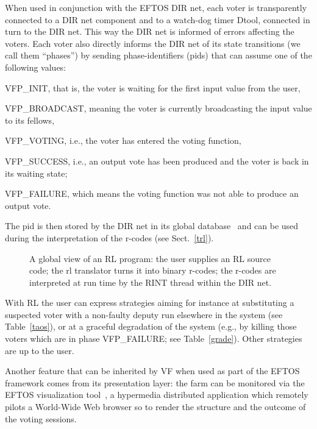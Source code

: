 \documentclass[11pt]{article}
\begin{document}
When used in conjunction with the EFTOS DIR net, each voter
is transparently connected to a DIR net component and to a watch-dog timer Dtool,
connected in turn to the DIR net. This way the DIR net is informed of
errors affecting the voters. Each voter also directly informs the DIR net
of its state transitions (we call them ``phases'') by sending phase-identifiers
(pids) that can assume one of the following values:

\begin{description}
\item{{\sf VFP\_INIT},} that is, the voter is waiting for
the first input value from the user,
\item{{\sf VFP\_BROADCAST},} meaning the voter is currently
broadcasting the input value to its fellows,
\item{{\sf VFP\_VOTING},} i.e., the voter has entered the
voting function,
\item{{\sf VFP\_SUCCESS},} i.e., an output vote has been
produced and the voter is back in its waiting state;
\item{{\sf VFP\_FAILURE},} which means the voting function
was not able to produce an output vote.
\end{description}

The pid is then stored by the DIR net in its global
database~\cite{TrDe97a} and can be used during the interpretation
of the r-codes (see Sect.~\ref{trl}).

\begin{figure}
\centerline{}
\caption{A global view of an RL program: the user supplies an RL
source code; the {\sf rl} translator turns it into binary r-codes; the r-codes
are interpreted at run time by the RINT thread within the DIR net.}
\label{scheme}
\end{figure}

With RL the user can express strategies aiming for instance at substituting
a suspected voter with a non-faulty deputy run
elsewhere in the system (see Table~\ref{taos}), or at
a graceful degradation of the system (e.g., by killing those
voters which are in phase {\sf VFP\_FAILURE}; see Table~\ref{grade}).
Other strategies are up to the user.

Another feature that can be inherited by VF
when used as part of the EFTOS framework comes from its presentation layer:
the farm can be monitored
via the EFTOS visualization tool~\cite{DeDT97a}, a hypermedia distributed
application which remotely pilots a World-Wide Web browser so to
render the structure and the outcome of the voting sessions.
\end{document}

